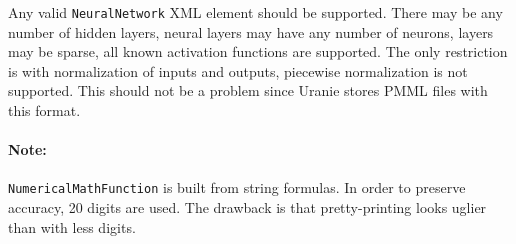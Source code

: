 Any valid \texttt{NeuralNetwork} XML element should be supported.  There may be any number of hidden layers, neural layers may have any number of neurons, layers may be sparse, all known activation functions are supported.  The only restriction is with normalization of inputs and outputs, piecewise normalization is not supported.  This should not be a problem since Uranie stores PMML files with this format.

\paragraph{Note:}
\texttt{NumericalMathFunction} is built from string formulas.  In order to preserve accuracy, 20 digits are used.  The drawback is that pretty-printing looks uglier than with less digits.
